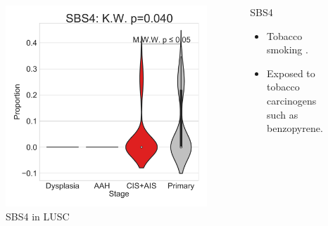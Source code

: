 \documentclass{beamer}
\begin{document}
\begin{frame}[allowframebreaks]
                    \begin{columns}
                        \begin{column}{0.4 \textwidth}
                            \begin{figure}
                                \includegraphics[width=\linewidth]{figures/SigProfiler/BWA-Violin/COSMIC-SingleBase.SQC.Subtype.Relative/SBS4.pdf}
                                \caption{SBS4 in LUSC}
                            \end{figure}
                        \end{column}
                        \begin{column}{0.55 \textwidth}
                            \begin{block}{SBS4}
                                \begin{itemize}
                                    \item Tobacco smoking \cite{signature-02}.
                                    \item Exposed to tobacco carcinogens such as benzopyrene.
                                \end{itemize}
                            \end{block}
                        \end{column}
                    \end{columns}


\end{frame}
\end{document}
